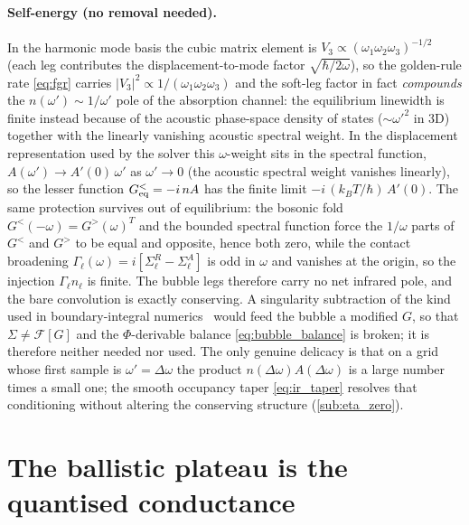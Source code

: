 \paragraph{Self-energy (no removal needed).}
In the harmonic mode basis the cubic matrix element is
$V_3\propto(\omega_1\omega_2\omega_3)^{-1/2}$ (each leg contributes the
displacement-to-mode factor $\sqrt{\hbar/2\omega}$), so the golden-rule rate
\cref{eq:fgr} carries $|V_3|^2\propto1/(\omega_1\omega_2\omega_3)$ and the soft-leg
factor in fact \emph{compounds} the $n(\omega')\sim1/\omega'$ pole of the absorption
channel: the equilibrium linewidth is finite instead because of the acoustic
phase-space density of states ($\sim\omega'^2$ in 3D) together with the linearly
vanishing acoustic spectral weight. In the displacement representation used by the
solver this $\omega$-weight sits in the spectral function, $A(\omega')\to
A'(0)\,\omega'$ as $\omega'\to0$ (the acoustic spectral weight vanishes linearly), so
the lesser function $G^{<}_{\rm eq}=-i\,nA$ has the finite limit
$-i\,(k_BT/\hbar)\,A'(0)$. The same protection survives out of equilibrium: the
bosonic fold $G^{<}(-\omega)=G^{>}(\omega)^T$ and the bounded spectral function force
the $1/\omega$ parts of $G^{<}$ and $G^{>}$ to be equal and opposite, hence both
zero, while the contact broadening $\Gamma_\ell(\omega)=i[\Sigma^R_\ell-\Sigma^A_\ell]$
is odd in $\omega$ and vanishes at the origin, so the injection $\Gamma_\ell n_\ell$
is finite. The bubble legs therefore carry no net infrared pole, and the bare
convolution is exactly conserving. A singularity subtraction of the kind used in
boundary-integral
numerics~\cite{helsing_higher_2013,hanninen_singularity_2006,wang_logarithmic_2023,toler_fast_2023}
would feed the bubble a modified $G$, so that $\Sigma\neq\mathcal{F}[G]$ and the
$\Phi$-derivable balance \cref{eq:bubble_balance} is broken; it is therefore neither
needed nor used. The only genuine delicacy is that on a grid whose first sample is
$\omega'=\Delta\omega$ the product $n(\Delta\omega)A(\Delta\omega)$ is a large number
times a small one; the smooth occupancy taper \cref{eq:ir_taper} resolves that
conditioning without altering the conserving structure (\cref{sub:eta_zero}).

\section{The ballistic plateau is the quantised conductance}
\label{sec:ir_plateau_proof}

